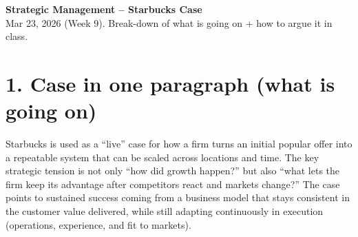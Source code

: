 \documentclass[10pt,a4paper]{article}
\begin{document}
\begin{center}
{\large\bfseries\color{eublue} Strategic Management -- Starbucks Case}\\[0.2em]
\footnotesize Mar 23, 2026 (Week 9). Break-down of what is going on + how to argue it in class.
\end{center}
\vspace{0.6em}

\section*{\color{eublue}1. Case in one paragraph (what is going on)}
Starbucks is used as a ``live'' case for how a firm turns an initial popular offer into a repeatable system that can be scaled across locations and time. The key strategic tension is not only ``how did growth happen?'' but also ``what lets the firm keep its advantage after competitors react and markets change?'' The case points to sustained success coming from a business model that stays consistent in the customer value delivered, while still adapting continuously in execution (operations, experience, and fit to markets).
\end{document}
